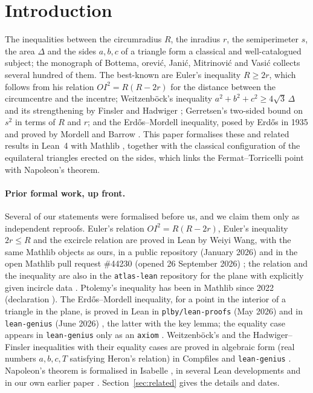 \documentclass[11pt]{article}
\theoremstyle{definition}
\theoremstyle{remark}
\newcommand{\lean}[1]{\texttt{#1}}
\begin{document}
\section{Introduction}\label{sec:intro}
The inequalities between the circumradius $R$, the inradius $r$, the semiperimeter $s$, the area
$\Delta$ and the sides $a,b,c$ of a triangle form a classical and well-catalogued subject; the
monograph of Bottema, \DJ{}or\dj{}evi\'c, Jani\'c, Mitrinovi\'c and Vasi\'c \cite{bottema} collects
several hundred of them. The best-known are Euler's inequality $R\ge 2r$, which follows from his
relation $OI^2=R(R-2r)$ for the distance between the circumcentre and the incentre; Weitzenb\"ock's
inequality $a^2+b^2+c^2\ge 4\sqrt3\,\Delta$ \cite{weitzenboeck} and its strengthening by Finsler
and Hadwiger \cite{finslerhadwiger}; Gerretsen's two-sided bound on $s^2$ in terms of $R$ and $r$;
and the Erdős--Mordell inequality, posed by Erdős in 1935 \cite{erdos1935} and proved by Mordell and
Barrow \cite{mordellbarrow1937}. This paper formalises these and related results in Lean~4
\cite{lean4} with Mathlib \cite{mathlib}, together with the classical configuration of the
equilateral triangles erected on the sides, which links the Fermat--Torricelli point with Napoleon's
theorem.

\paragraph{Prior formal work, up front.} Several of our statements were formalised before us, and we
claim them only as independent reproofs. Euler's relation $OI^2=R(R-2r)$, Euler's inequality
$2r\le R$ and the excircle relation are proved in Lean by Weiyi Wang, with the same Mathlib objects
as ours, in a public repository (January 2026) \cite{wwylele} and in the open Mathlib pull request
\#44230 (opened 26 September 2026) \cite{pr44230}; the relation and the inequality are also in the
\lean{atlas-lean} repository for the plane with explicitly given incircle data \cite{atlaseuler}.
Ptolemy's inequality has been in Mathlib since 2022 \cite{mathlib} (declaration
). The Erdős--Mordell inequality, for a
point in the interior of a triangle in the plane, is proved in Lean in \lean{plby/lean-proofs}
(May 2026) \cite{plby} and in \lean{lean-genius} (June 2026) \cite{lgmordell}, the latter with
the key lemma; the equality case appears in \lean{lean-genius} only as an \lean{axiom}
\cite{lg898}. Weitzenb\"ock's and the Hadwiger--Finsler inequalities with their equality cases are
proved in algebraic form (real numbers $a,b,c,T$ satisfying Heron's relation) in Compfiles
\cite{compfiles} and \lean{lean-genius} \cite{lgweitz,lghf}. Napoleon's theorem is formalised in
Isabelle \cite{afpnapoleon}, in several Lean developments \cite{tanrikolu,shadowbench,atlasnapoleon}
and in our own earlier paper \cite{paperA}. Section~\ref{sec:related} gives the details and dates.
\end{document}
